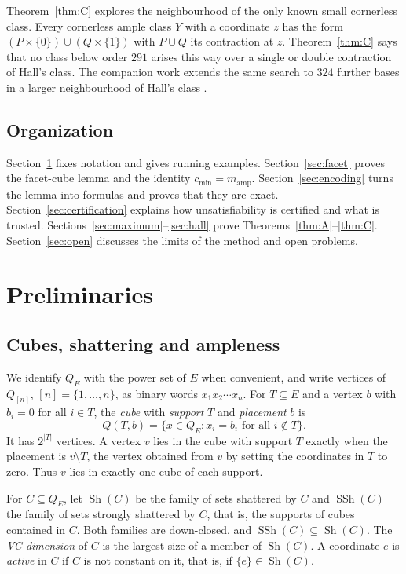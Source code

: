 \documentclass[11pt]{article}
\numberwithin{equation}{section}
\theoremstyle{definition}
\theoremstyle{remark}
\newcommand{\Sh}{\operatorname{Sh}}
\newcommand{\SSh}{\operatorname{SSh}}
\newcommand{\cmin}{c_{\min}}
\newcommand{\mamp}{m_{\mathrm{amp}}}
\begin{document}
Theorem~\ref{thm:C} explores the neighbourhood of the only known small
cornerless class.  Every cornerless ample class \(Y\) with a coordinate
\(z\) has the form \((P\times\{0\})\cup(Q\times\{1\})\) with
\(P\cup Q\) its contraction at \(z\).  Theorem~\ref{thm:C} says that no
class below order \(291\) arises this way over a single or double
contraction of Hall's class.  The companion work extends the same search to
\(324\) further bases in a larger neighbourhood of Hall's class
\cite{BousquetDampReader}.

\subsection{Organization}

Section~\ref{sec:prelim} fixes notation and gives running examples.
Section~\ref{sec:facet} proves the facet-cube lemma and the identity
\(\cmin=\mamp\).  Section~\ref{sec:encoding} turns the lemma into formulas
and proves that they are exact.  Section~\ref{sec:certification} explains
how unsatisfiability is certified and what is trusted.
Sections~\ref{sec:maximum}--\ref{sec:hall} prove
Theorems~\ref{thm:A}--\ref{thm:C}.  Section~\ref{sec:open} discusses the
limits of the method and open problems.

\section{Preliminaries}
\label{sec:prelim}

\subsection{Cubes, shattering and ampleness}

We identify \(Q_E\) with the power set of \(E\) when convenient, and write
vertices of \(Q_{[n]}\), \([n]=\{1,\dots,n\}\), as binary words
\(x_1x_2\cdots x_n\).  For \(T\subseteq E\) and a vertex \(b\) with
\(b_i=0\) for all \(i\in T\), the \emph{cube} with \emph{support} \(T\)
and \emph{placement} \(b\) is
\[
 Q(T,b)=\{x\in Q_E: x_i=b_i\text{ for all } i\notin T\}.
\]
It has \(2^{|T|}\) vertices.  A vertex \(v\) lies in the cube with support
\(T\) exactly when the placement is \(v\setminus T\), the vertex obtained
from \(v\) by setting the coordinates in \(T\) to zero.  Thus \(v\) lies in
exactly one cube of each support.

For \(C\subseteq Q_E\), let \(\Sh(C)\) be the family of sets shattered by
\(C\) and \(\SSh(C)\) the family of sets strongly shattered by \(C\), that
is, the supports of cubes contained in \(C\).  Both families are
down-closed, and \(\SSh(C)\subseteq\Sh(C)\).  The \emph{VC dimension} of
\(C\) is the largest size of a member of \(\Sh(C)\).  A coordinate \(e\) is
\emph{active} in \(C\) if \(C\) is not constant on it, that is, if
\(\{e\}\in\Sh(C)\).
\end{document}
